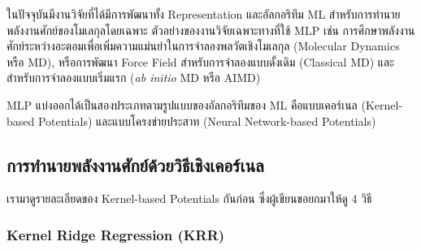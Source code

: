 ในปัจจุบันมีงานวิจัยที่ได้มีการพัฒนาทั้ง Representation และอัลกอริทึม ML\autocite{behler2016,botu2017,brockherde2017} สำหรับการทำนายพลังงานศักย์ของโมเลกุลโดยเฉพาะ ตัวอย่างของงานวิจัยเฉพาะทางที่ใช้ MLP เช่น การศึกษาพลังงานศักย์ระหว่างอะตอมเพื่อเพิ่มความแม่นยำในการจำลองพลวัตเชิงโมเลกุล (Molecular Dynamics หรือ MD)\autocite{deringer2019,mortazavi2020,zuo2020,dhaliwal2022}, หรือการพัฒนา Force Field สำหรับการจำลองแบบดั้งเดิม (Classical MD)\autocite{noe2020} และสำหรับการจำลองแบบเริ่มแรก (\textit{ab initio} MD หรือ AIMD)\autocite{sivaraman2020,schran2021,li2022}

MLP แบ่งออกได้เป็นสองประเภทตามรูปแบบของอัลกอริทึมของ ML คือแบบเคอร์เนล (Kernel-based Potentials) และแบบโครงข่ายประสาท (Neural Network-based Potentials)

\subsection{การทำนายพลังงานศักย์ด้วยวิธีเชิงเคอร์เนล}
\label{ssec:pred_pot_ener_kernel}

เรามาดูรายละเอียดของ Kernel-based Potentials กันก่อน ซึ่งผู้เขียนขอยกมาให้ดู 4 วิธี

\subsubsection{Kernel Ridge Regression (KRR)} 

